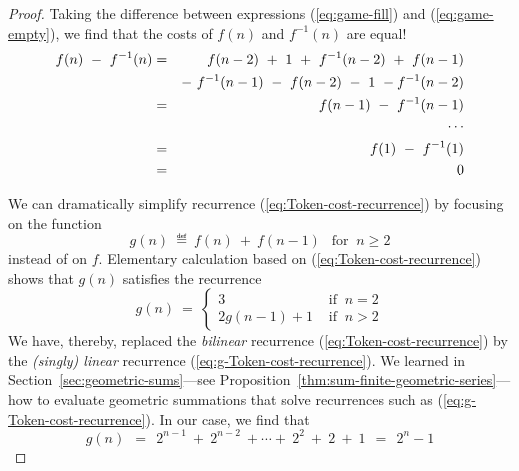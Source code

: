 \begin{proof}
{\begin{minipage}{0.95\textwidth}
\smallskip

Taking the difference between expressions (\ref{eq:game-fill}) and (\ref{eq:game-empty}), we find that the costs of $f(n)$ and $f^{-1}(n)$ are equal!
\begin{eqnarray*}
f(n) \ - \ f^{-1}(n)
   & = & f(n-2) \ + \ 1 \ + \ f^{-1}(n-2) \ + \  f(n-1)   \\
   &    &  - \ f^{-1}(n-1) \ - \ f(n-2)  \ - \  1 \ - f^{-1}(n-2) \\
   & = & f(n-1) \ - \ f^{-1}(n-1) \\
   &    &  \hspace*{.25in} \cdots \\
   & = &  f(1) \ - \ f^{-1}(1) \\
   & = & 0
\end{eqnarray*}
\end{minipage}
}
\bigskip

We can dramatically simplify recurrence (\ref{eq:Token-cost-recurrence}) by focusing on the function
\[ g(n) \ \eqdef \ f(n) \ + \ f(n-1) \ \ \mbox{ for } \ n \geq 2 \]
instead of on $f$.  Elementary calculation based on (\ref{eq:Token-cost-recurrence}) shows that $g(n)$ satisfies the recurrence
\begin{equation}
\label{eq:g-Token-cost-recurrence}
g(n) \ = \ \left\{
\begin{array}{ll}
3 & \mbox{ if } \ n=2 \\
2 g(n-1) + 1 & \mbox{ if } \  n > 2
\end{array}
\right.
\end{equation}
We have, thereby, replaced the {\em bilinear} recurrence (\ref{eq:Token-cost-recurrence}) by the {\em (singly) linear} recurrence (\ref{eq:g-Token-cost-recurrence}).  We learned in
Section~\ref{sec:geometric-sums}---see Proposition~\ref{thm:sum-finite-geometric-series}---how to evaluate geometric summations that solve recurrences such as (\ref{eq:g-Token-cost-recurrence}).  In our case, we find that
\begin{equation}
\label{eq:VALUE-g-Token-cost}
g(n) \ \ = \ \ 2^{n-1} \ + \ 2^{n-2} \ + \cdots + \ 2^2 \ + \ 2 \ + \ 1 \ \ = \ \ 2^{n} -1
\end{equation}

\smallskip


\end{proof}
